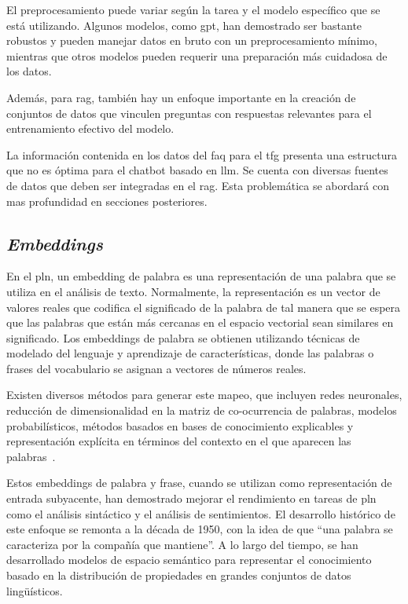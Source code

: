 El preprocesamiento puede variar según la tarea y el modelo específico que se está utilizando. Algunos modelos, como \acrfull{gpt}, han demostrado ser bastante robustos y pueden manejar datos en bruto con un preprocesamiento mínimo, mientras que otros modelos pueden requerir una preparación más cuidadosa de los datos. 

Además, para \acrshort{rag}, también hay un enfoque importante en la creación de conjuntos de datos que vinculen preguntas con respuestas relevantes para el entrenamiento efectivo del modelo. 

La información contenida en los datos del \acrshort{faq} para el \acrshort{tfg} presenta una estructura que no es óptima para el chatbot basado en \acrshort{llm}. Se cuenta con diversas fuentes de datos que deben ser integradas en el \acrshort{rag}. Esta problemática se abordará con mas profundidad en secciones posteriores.

\subsection{\textit{Embeddings}}

En el \acrfull{pln}, un embedding de palabra es una representación de una palabra que se utiliza en el análisis de texto. Normalmente, la representación es un vector de valores reales que codifica el significado de la palabra de tal manera que se espera que las palabras que están más cercanas en el espacio vectorial sean similares en significado. Los embeddings de palabra se obtienen utilizando técnicas de modelado del lenguaje y aprendizaje de características, donde las palabras o frases del vocabulario se asignan a vectores de números reales.

Existen diversos métodos para generar este mapeo, que incluyen redes neuronales, reducción de dimensionalidad en la matriz de co-ocurrencia de palabras, modelos probabilísticos, métodos basados en bases de conocimiento explicables y representación explícita en términos del contexto en el que aparecen las palabras~\cite{mikolov2013distributed}.

Estos embeddings de palabra y frase, cuando se utilizan como representación de entrada subyacente, han demostrado mejorar el rendimiento en tareas de \acrshort{pln} como el análisis sintáctico y el análisis de sentimientos. El desarrollo histórico de este enfoque se remonta a la década de 1950, con la idea de que ``una palabra se caracteriza por la compañía que mantiene''. A lo largo del tiempo, se han desarrollado modelos de espacio semántico para representar el conocimiento basado en la distribución de propiedades en grandes conjuntos de datos lingüísticos.

